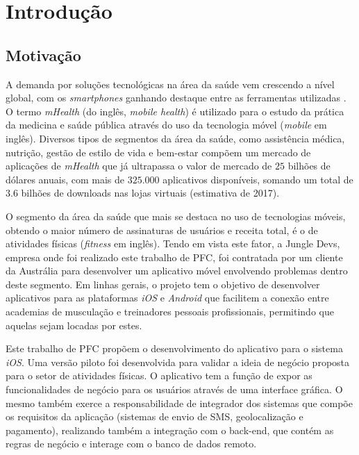 \chapter{Introdução}
\section{Motivação}
A demanda por soluções tecnológicas na área da saúde vem crescendo a nível global, com os  \textit{smartphones} ganhando destaque entre as ferramentas utilizadas . O termo \textit{mHealth} (do inglês, \textit{mobile health}) é utilizado para o estudo da prática da medicina e saúde pública através do uso da tecnologia móvel (\textit{mobile} em inglês). Diversos tipos de segmentos da área da saúde, como assistência médica, nutrição, gestão de estilo de vida e bem-estar compõem um mercado de aplicações de \textit{mHealth} que já ultrapassa o valor de mercado de $25$ bilhões de dólares anuais, com mais de $325.000$ aplicativos disponíveis, somando um total de $3.6$ bilhões de downloads nas lojas virtuais (estimativa de 2017).

O segmento da área da saúde que mais se destaca no uso de tecnologias móveis, obtendo o maior número de assinaturas de usuários e receita total, é o de atividades físicas (\textit{fitness} em inglês). Tendo em vista este fator, a Jungle Devs, empresa onde foi realizado este trabalho de PFC, foi contratada por um cliente da Austrália para desenvolver um aplicativo móvel envolvendo problemas dentro deste segmento. Em linhas gerais, o projeto tem o objetivo de desenvolver aplicativos para as plataformas \textit{iOS} e \textit{Android} que facilitem a conexão entre academias de musculação e treinadores pessoais profissionais, permitindo que aquelas sejam locadas por estes.

Este trabalho de PFC propõem o desenvolvimento do aplicativo para o sistema \textit{iOS}. Uma versão piloto foi desenvolvida para validar a ideia de negócio proposta para o setor de atividades físicas. O aplicativo tem a função de expor as funcionalidades de negócio para os usuários através de uma interface gráfica. O mesmo também exerce a responsabilidade de integrador dos sistemas que compõe os requisitos da aplicação (sistemas de envio de SMS, geolocalização e pagamento), realizando também a integração com o back-end, que contém as regras de negócio e interage com o banco de dados remoto.

